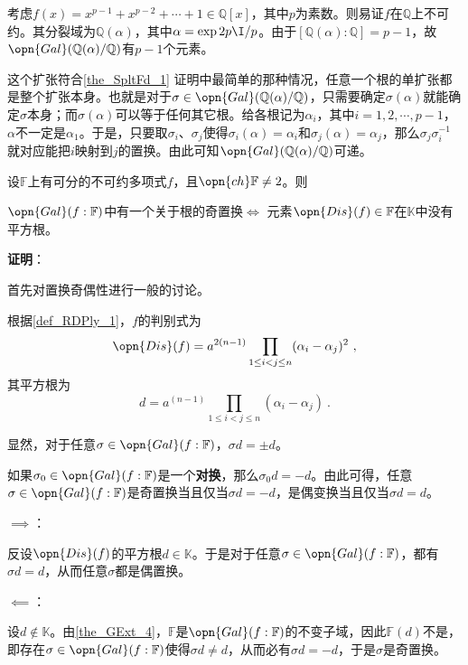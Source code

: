\begin{example}{}
考虑$f(x)=x^{p-1}+x^{p-2}+\cdots+1\in\mathbb{Q}[x]$，其中$p$为素数。则易证$f$在$\mathbb{Q}$上不可约。其分裂域为$\mathbb{Q}(\alpha)$，其中$\alpha=\exp{2p\I/p}$。由于$[\mathbb{Q}(\alpha):\mathbb{Q}]=p-1$，故$\opn{Gal}(\mathbb{Q}(\alpha)/\mathbb{Q})$有$p-1$个元素。

这个扩张符合\autoref{the_SpltFd_1} 证明中最简单的那种情况，任意一个根的单扩张都是整个扩张本身。也就是对于$\sigma\in\opn{Gal}(\mathbb{Q}(\alpha)/\mathbb{Q})$，只需要确定$\sigma(\alpha)$就能确定$\sigma$本身；而$\sigma(\alpha)$可以等于任何其它根。给各根记为$\alpha_i$，其中$i=1, 2, \cdots, p-1$，$\alpha$不一定是$\alpha_1$。于是，只要取$\sigma_i$、$\sigma_j$使得$\sigma_i(\alpha)=\alpha_i$和$\sigma_j(\alpha)=\alpha_j$，那么$\sigma_j\sigma_i^{-1}$就对应能把$i$映射到$j$的置换。由此可知$\opn{Gal}(\mathbb{Q}(\alpha)/\mathbb{Q})$可递。
\end{example}


\begin{theorem}{}
设$\mathbb{F}$上有可分的不可约多项式$f$，且$\opn{ch}\mathbb{F}\neq 2$。则

$\opn{Gal}(f:\mathbb{F})$中有一个关于根的奇置换$\iff$ 元素$\opn{Dis}(f)\in\mathbb{F}$在$\mathbb{K}$中没有平方根。
\end{theorem}

\textbf{证明}：

首先对置换奇偶性进行一般的讨论。

根据\autoref{def_RDPly_1}，$f$的判别式为
\begin{equation}
\opn{Dis}(f) = a^{2(n-1)}\prod_{1\leq i<j\leq n}(\alpha_i-\alpha_j)^2~,
\end{equation}
其平方根为
\begin{equation}
d = a^{(n-1)}\prod_{1\leq i<j\leq n}(\alpha_i-\alpha_j)~.
\end{equation}

显然，对于任意$\sigma\in\opn{Gal}(f:\mathbb{F})$，$\sigma d=\pm d$。

如果$\sigma_0\in\opn{Gal}(f:\mathbb{F})$是一个\textbf{对换}，那么$\sigma_0 d=-d$。由此可得，任意$\sigma\in\opn{Gal}(f:\mathbb{F})$是奇置换当且仅当$\sigma d=-d$，是偶变换当且仅当$\sigma d=d$。

$\implies$：

反设$\opn{Dis}(f)$的平方根$d\in\mathbb{K}$。于是对于任意$\sigma\in\opn{Gal}(f:\mathbb{F})$，都有$\sigma d = d$，从而任意$\sigma$都是偶置换。

$\impliedby$：

设$d\not\in\mathbb{K}$。由\autoref{the_GExt_4}，$\mathbb{F}$是$\opn{Gal}(f:\mathbb{F})$的不变子域，因此$\mathbb{F}(d)$不是，即存在$\sigma\in\opn{Gal}(f:\mathbb{F})$使得$\sigma d\neq d$，从而必有$\sigma d= -d$，于是$\sigma$是奇置换。

